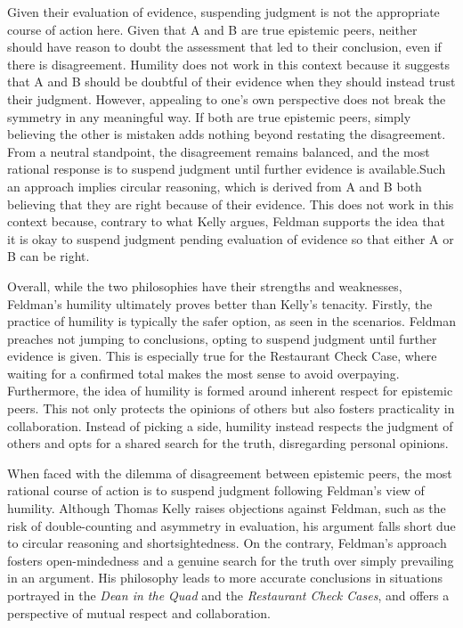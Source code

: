 \documentclass[12pt, a4paper, twoside]{article}
\begin{document}
Given their evaluation of evidence, suspending judgment is not the appropriate course of action here. Given that A and B are true epistemic peers, neither should have reason to doubt the assessment that led to their conclusion, even if there is disagreement. Humility does not work in this context because it suggests that A and B should be doubtful of their evidence when they should instead trust their judgment. However, appealing to one’s own perspective does not break the symmetry in any meaningful way. If both are true epistemic peers, simply believing the other is mistaken adds nothing beyond restating the disagreement. From a neutral standpoint, the disagreement remains balanced, and the most rational response is to suspend judgment until further evidence is available.Such an approach implies circular reasoning, which is derived from A and B both believing that they are right because of their evidence. This does not work in this context because, contrary to what Kelly argues, Feldman supports the idea that it is okay to suspend judgment pending evaluation of evidence so that either A or B can be right.

Overall, while the two philosophies have their strengths and weaknesses, Feldman’s humility ultimately proves better than Kelly’s tenacity. Firstly, the practice of humility is typically the safer option, as seen in the scenarios. Feldman preaches not jumping to conclusions, opting to suspend judgment until further evidence is given. This is especially true for the Restaurant Check Case, where waiting for a confirmed total makes the most sense to avoid overpaying. Furthermore, the idea of humility is formed around inherent respect for epistemic peers. This not only protects the opinions of others but also fosters practicality in collaboration. Instead of picking a side, humility instead respects the judgment of others and opts for a shared search for the truth, disregarding personal opinions. 

When faced with the dilemma of disagreement between epistemic peers, the most rational course of action is to suspend judgment following Feldman’s view of humility. Although Thomas Kelly raises objections against Feldman, such as the risk of double-counting and asymmetry in evaluation, his argument falls short due to circular reasoning and shortsightedness. On the contrary, Feldman’s approach fosters open-mindedness and a genuine search for the truth over simply prevailing in an argument. His philosophy leads to more accurate conclusions in situations portrayed in the \emph{Dean in the Quad} and the \emph{Restaurant Check Cases}, and offers a perspective of mutual respect and collaboration. 



\printbibliography
\end{document}
